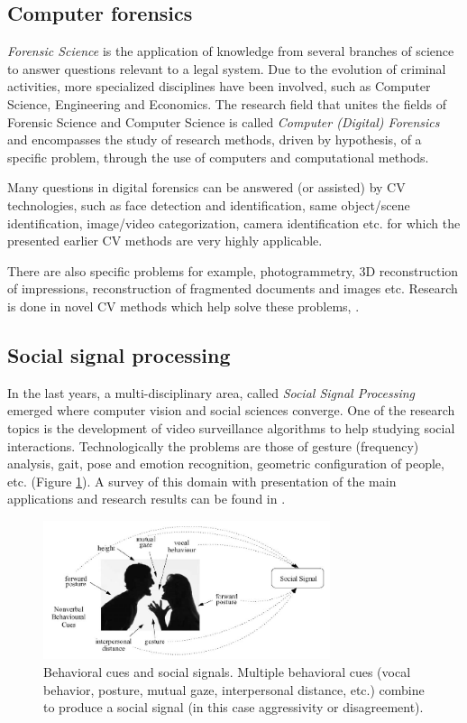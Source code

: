 \subsection{Computer forensics}
{\em  Forensic Science} is the application of knowledge from several branches of science to answer questions relevant to a legal system. Due to the evolution of criminal activities, more
specialized disciplines have been involved, such as Computer Science, Engineering and Economics.
The research field that unites the fields of Forensic Science and Computer Science is called {\em Computer (Digital) Forensics} and encompasses the study of research methods, driven by
hypothesis, of a specific problem, through the use of computers and computational methods.

Many questions in digital forensics can be answered (or assisted) by CV technologies, such as face detection and identification, same object/scene identification, image/video categorization, camera identification etc. for which the presented earlier CV methods are very highly applicable.

There are also specific problems for example, photogrammetry, 3D  reconstruction  of  impressions, reconstruction of fragmented documents and images etc. Research is done in novel CV methods which help solve these problems, \cite{Andalo13SIBGRAPI}.

\subsection{Social signal processing}
In the last years, a multi-disciplinary area, called {\em Social  Signal  Processing} emerged where computer vision and social sciences converge.  One of the research topics is the development of video surveillance  algorithms to help studying social interactions. Technologically the problems are those of gesture (frequency) analysis, gait, pose and emotion recognition, geometric configuration of people, etc. (Figure \ref{fig:SSP}). A survey of this domain with presentation of the main applications and research results can be found in \cite{Vinciarelli:2009}. 

\begin{figure}[H]
\begin{center}
\includegraphics[width=0.75\textwidth]{fig/SSP}
\end{center}
\caption{Behavioral cues and social signals. Multiple behavioral cues (vocal behavior, posture, mutual gaze, interpersonal distance, etc.) combine to produce a social signal
(in this case aggressivity or disagreement).}
\label{fig:SSP}
\end{figure}


